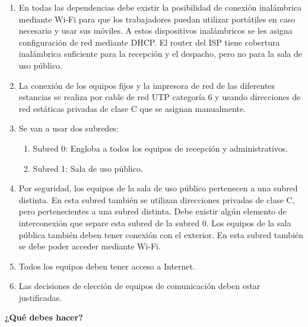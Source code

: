 \begin{enumerate}
    \item En todas las dependencias debe existir la posibilidad de conexión inalámbrica mediante Wi-Fi para que los trabajadores puedan utilizar portátiles en caso necesario y usar sus móviles. A estos dispositivos inalámbricos se les asigna configuración de red mediante DHCP. El router del ISP tiene cobertura inalámbrica suficiente para la recepción y el despacho, pero no para la sala de uso público.
    \item La conexión de los equipos fijos y la impresora de red de las diferentes estancias se realiza por cable de red UTP categoría 6 y usando direcciones de red estáticas privadas de clase C que se asignan manualmente.
    \item Se van a usar dos subredes:
    \begin{enumerate}
        \item Subred 0: Engloba a todos los equipos de recepción y administrativos.
        \item Subred 1: Sala de uso público.
    \end{enumerate}
    \item Por seguridad, los equipos de la sala de uso público pertenecen a una subred distinta. En esta subred también se utilizan direcciones privadas de clase C, pero pertenecientes a una subred distinta. Debe existir algún elemento de interconexión que separe esta subred de la subred 0. Los equipos de la sala pública también deben tener conexión con el exterior. En esta subred también se debe poder acceder mediante Wi-Fi.
    \item Todos los equipos deben tener acceso a Internet.
    \item Las decisiones de elección de equipos de comunicación deben estar justificadas.
\end{enumerate}

\textbf{¿Qué debes hacer?}

